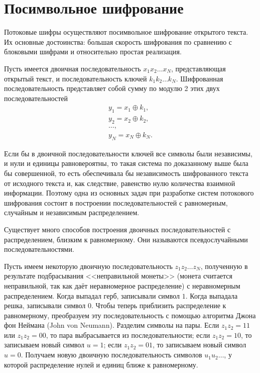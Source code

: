 \section{Посимвольное шифрование}

Потоковые шифры осуществляют посимвольное шифрование открытого текста. Их основные достоинства: большая скорость шифрования по сравнению с блоковыми шифрами и относительно простая реализация.

Пусть имеется двоичная последовательность $x_{1} x_{2} \dots x_{N}$, представляющая открытый текст, и последовательность ключей $k_{1} k_{2} \dots k_{N}$. Шифрованная последовательность представляет собой сумму по модулю 2 этих двух последовательностей
\[ \begin{array}{l}
    y_{1} = x_{1} \oplus k_{1}, \\
    y_{2} = x_{2} \oplus k_{2}, \\
    \dots, \\
    y_{N} = x_{N} \oplus k_{N}.
\end{array} \]

Если бы в двоичной последовательности ключей все символы были независимы, и нули и единицы равновероятны, то такая система по доказанному выше была бы совершенной, то есть обеспечивала бы независимость шифрованного текста от исходного текста и, как следствие, равенство нулю количества взаимной информации. Поэтому одна из основных задач при разработке систем потокового шифрования состоит в построении последовательностей с равномерным, случайным и независимым распределением.

Существует много способов построения двоичных последовательностей с распределением, близким к равномерному. Они называются псевдослучайными последовательностями.

Пусть имеем некоторую двоичную последовательность $z_{1} z_{2} \ldots z_{N}$, полученную в результате подбрасывания <<неправильной монеты>> (монета считается неправильной, так как даёт неравномерное распределение) с неравномерным распределением. Когда выпадал герб, записывали символ $1$. Когда выпадала решка, записывали символ $0$. Чтобы теперь приблизить распределение к равномерному, преобразуем эту последовательность с помощью алгоритма Джона фон Неймана (John von Neumann). Разделим символы на пары. Если $z_{1} z_{2} = 11$ или $z_{1} z_{2} = 00$, то пара выбрасывается из последовательности; если $z_{1} z_{2} =10$, то записываем новый символ $u=1$; если $z_{1} z_{2} =01$, то записываем новый символ $u=0$. Получаем новую двоичную последовательность символов $u_{1}u_{2}\ldots $, у которой распределение нулей и единиц ближе к равномерному.
